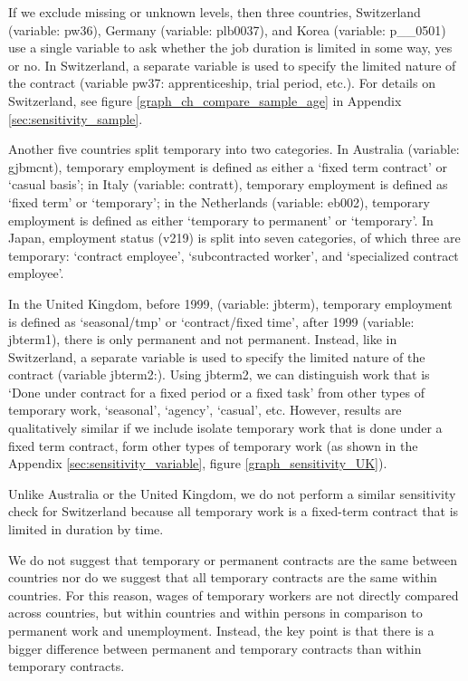 If we exclude missing or unknown levels, then three countries, Switzerland (variable: pw36), Germany (variable: plb0037), and Korea (variable: p\_\_0501) use a single variable to ask whether the job duration is limited in some way, yes or no.  In Switzerland, a separate variable is used to specify the limited nature of the contract (variable pw37: apprenticeship, trial period, etc.).  For details on Switzerland, see figure \ref{graph_ch_compare_sample_age} in Appendix \ref{sec:sensitivity_sample}.

Another five countries split temporary into two categories.  In Australia (variable: gjbmcnt), temporary employment is defined as either a `fixed term contract' or `casual basis'; in Italy (variable: contratt), temporary employment is defined as `fixed term' or `temporary'; in the Netherlands (variable: eb002), temporary employment is defined as either `temporary to permanent' or  `temporary'.  In Japan, employment status (v219) is split into seven categories, of which three are temporary: `contract employee', `subcontracted worker', and `specialized contract employee'.  

In the United Kingdom, before 1999, (variable: jbterm), temporary employment is defined as `seasonal/tmp' or  `contract/fixed time', after 1999 (variable: jbterm1), there is only permanent and not permanent.  Instead, like in Switzerland, a separate variable is used to specify the limited nature of the contract (variable jbterm2:).  Using jbterm2, we can distinguish work that is `Done under contract for a fixed period or a fixed task' from other types of temporary work, `seasonal', `agency', `casual', etc.  However, results are qualitatively similar if we include isolate temporary work that is done under a fixed term contract, form other types of temporary work (as shown in the Appendix \ref{sec:sensitivity_variable}, figure \ref{graph_sensitivity_UK}).  

Unlike Australia or the United Kingdom, we do not perform a similar sensitivity check for Switzerland because all temporary work is a fixed-term contract that is limited in duration by time.

We do not suggest that temporary or permanent contracts are the same between countries nor do we suggest that all temporary contracts are the same within countries.  For this reason, wages of temporary workers are not directly compared across countries, but within countries and within persons in comparison to permanent work and unemployment.  Instead, the key point is that there is a bigger difference between permanent and temporary contracts than within temporary contracts.  

